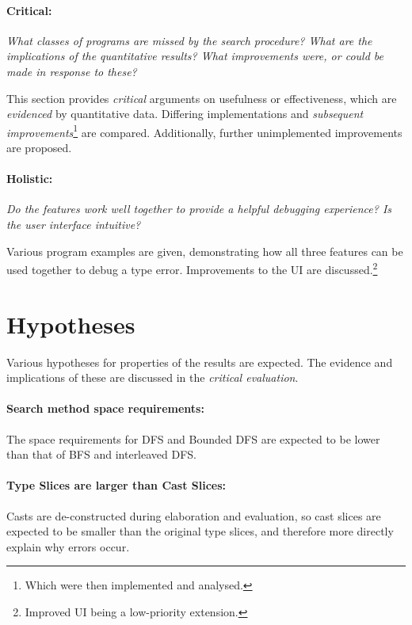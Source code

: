 \paragraph{Critical: } \textit{What \textit{classes} of programs are missed by the search procedure? What are the implications of the \textit{quantitative} results? What improvements were, or could be made in response to these?}

This section provides \textit{critical} arguments on {usefulness} or {effectiveness}, which are \textit{evidenced} by quantitative data. Differing implementations and \textit{subsequent improvements}\footnote{Which were then implemented and analysed.} are compared. Additionally, further unimplemented improvements are proposed.

\paragraph{Holistic: } \textit{Do the features work well together to provide a helpful debugging experience? Is the user interface intuitive?}

Various program examples are given, demonstrating how all three features can be used together to debug a type error. Improvements to the UI are discussed.\footnote{Improved UI being a low-priority extension.} 



\section{Hypotheses}
Various hypotheses for properties of the results are expected. The evidence and implications of these are discussed in the \textit{critical evaluation}.

\paragraph{Search method space requirements: } The space requirements for DFS and Bounded DFS are expected to be lower than that of BFS and interleaved DFS.

\paragraph{Type Slices are larger than Cast Slices: } Casts are de-constructed during elaboration and evaluation, so cast slices are expected to be smaller than the original type slices, and therefore more directly explain why errors occur. 


